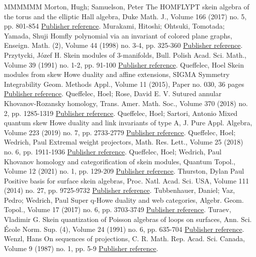 \documentclass[11pt]{article}
\theoremstyle{definition}
\numberwithin{equation}{section}
\begin{document}
\begin{thebibliography}{MMMMMM}
 Morton, Hugh; Samuelson, Peter The HOMFLYPT skein algebra of the torus and the elliptic Hall algebra, Duke Math. J., Volume 166 (2017) no. 5, pp. 801-854 \href{https://alco.centre-mersenne.org/articles/10.5802/alco.330/#MS}{Publisher reference}.
 Murakami, Hitoshi; Ohtsuki, Tomotada; Yamada, Shuji Homfly polynomial via an invariant of colored plane graphs, Enseign. Math. (2), Volume 44 (1998) no. 3-4, pp. 325-360 \href{https://alco.centre-mersenne.org/articles/10.5802/alco.330/#MOY}{Publisher reference}.
 Przytycki, Józef H. Skein modules of 3-manifolds, Bull. Polish Acad. Sci. Math., Volume 39 (1991) no. 1-2, pp. 91-100 \href{https://alco.centre-mersenne.org/articles/10.5802/alco.330/#Prz1}{Publisher reference}.
 Queffelec, Hoel Skein modules from skew Howe duality and affine extensions, SIGMA Symmetry Integrability Geom. Methods Appl., Volume 11 (2015), Paper no. 030, 36 pages \href{https://alco.centre-mersenne.org/articles/10.5802/alco.330/#Queff_aff}{Publisher reference}.
 Queffelec, Hoel; Rose, David E. V. Sutured annular Khovanov-Rozansky homology, Trans. Amer. Math. Soc., Volume 370 (2018) no. 2, pp. 1285-1319 \href{https://alco.centre-mersenne.org/articles/10.5802/alco.330/#QR2}{Publisher reference}.
 Queffelec, Hoel; Sartori, Antonio Mixed quantum skew Howe duality and link invariants of type A, J. Pure Appl. Algebra, Volume 223 (2019) no. 7, pp. 2733-2779 \href{https://alco.centre-mersenne.org/articles/10.5802/alco.330/#QS2}{Publisher reference}.
 Queffelec, Hoel; Wedrich, Paul Extremal weight projectors, Math. Res. Lett., Volume 25 (2018) no. 6, pp. 1911-1936 \href{https://alco.centre-mersenne.org/articles/10.5802/alco.330/#QW}{Publisher reference}.
 Queffelec, Hoel; Wedrich, Paul Khovanov homology and categorification of skein modules, Quantum Topol., Volume 12 (2021) no. 1, pp. 129-209 \href{https://alco.centre-mersenne.org/articles/10.5802/alco.330/#QW3}{Publisher reference}.
 Thurston, Dylan Paul Positive basis for surface skein algebras, Proc. Natl. Acad. Sci. USA, Volume 111 (2014) no. 27, pp. 9725-9732 \href{https://alco.centre-mersenne.org/articles/10.5802/alco.330/#Thu}{Publisher reference}.
 Tubbenhauer, Daniel; Vaz, Pedro; Wedrich, Paul Super q-Howe duality and web categories, Algebr. Geom. Topol., Volume 17 (2017) no. 6, pp. 3703-3749 \href{https://alco.centre-mersenne.org/articles/10.5802/alco.330/#TVW}{Publisher reference}.
 Turaev, Vladimir G. Skein quantization of Poisson algebras of loops on surfaces, Ann. Sci. École Norm. Sup. (4), Volume 24 (1991) no. 6, pp. 635-704 \href{https://alco.centre-mersenne.org/articles/10.5802/alco.330/#Tur}{Publisher reference}.
 Wenzl, Hans On sequences of projections, C. R. Math. Rep. Acad. Sci. Canada, Volume 9 (1987) no. 1, pp. 5-9 \href{https://alco.centre-mersenne.org/articles/10.5802/alco.330/#Wen}{Publisher reference}.
\end{thebibliography}
\end{document}
